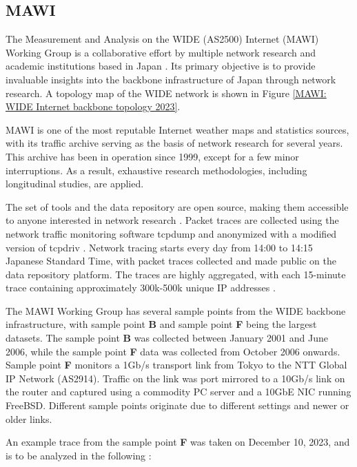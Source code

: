 \documentclass[sigconf,authorversion,nonacm]{acmart}
\begin{document}
\subsection{MAWI} The Measurement and Analysis on the WIDE (AS2500) Internet (MAWI) Working Group is a collaborative effort by multiple network research and academic institutions based in Japan \cite{271335}. Its primary objective is to provide invaluable insights into the backbone infrastructure of Japan through network research. A topology map of the WIDE network is shown in Figure \ref{MAWI: WIDE Internet backbone topology 2023}.

MAWI is one of the most reputable Internet weather maps and statistics sources, with its traffic archive serving as the basis of network research for several years. This archive has been in operation since 1999, except for a few minor interruptions. As a result, exhaustive research methodologies, including longitudinal studies, are applied.

The set of tools and the data repository are open source, making them accessible to anyone interested in network research \cite{MAWIDataset}. Packet traces are collected using the network traffic monitoring software tcpdump \cite{tcpdump} and anonymized with a modified version of tcpdriv \cite{TCPDPRIV}. Network tracing starts every day from 14:00 to 14:15 Japanese Standard Time, with packet traces collected and made public on the data repository platform. The traces are highly aggregated, with each 15-minute trace containing approximately 300k-500k unique IP addresses \cite{5061979}.

The MAWI Working Group has several sample points from the WIDE backbone infrastructure, with sample point \textbf{B} and sample point \textbf{F} being the largest datasets. The sample point \textbf{B} was collected between January 2001 and June 2006, while the sample point \textbf{F} data was collected from October 2006 onwards. Sample point \textbf{F} monitors a 1Gb/s transport link from Tokyo to the NTT Global IP Network (AS2914). Traffic on the link was port mirrored to a 10Gb/s link on the router and captured using a commodity PC server and a 10GbE NIC running FreeBSD. Different sample points originate due to different settings and newer or older links.

An example trace from the sample point \textbf{F} was taken on December 10, 2023, and is to be analyzed in the following \cite{traceMAWI}:
\end{document}
